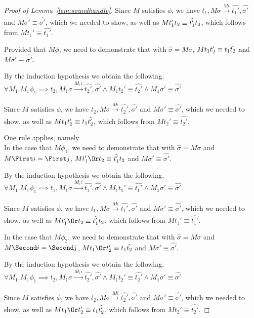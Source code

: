 \begin{proof}[Proof of Lemma~\ref{lem:soundhandle}]
{{    Since $M$ satisfies $\phi$, we have $t_1,M\sigma\xrightarrow[]{M i} \hat{t_1'},\hat{\sigma'}$ and $M\sigma'\equiv\hat{\sigma'}$,
    which we needed to show, as well as $M t_1'\relax t_2\equiv \hat{t_1'}\relax t_2$, which follows from $M t_1' \equiv \hat{t_1'}$.

    }
    {Provided that $M\phi$, we need to demonstrate that  with $\hat{\sigma}=M\sigma$,
    $M t_1\relax t_2'\equiv t_1\relax \hat{t_2}$ and $M\sigma'\equiv \hat{\sigma'}$.

    By the induction hypothesis we obtain the following.\\
    $\forall M_1 . M_1 \phi_1 \implies t_2,M_1\sigma \xrightarrow[]{M_1 i} \hat{t_2'},\hat{\sigma'}\land M_1 t_2'\equiv\hat{t_2'}\land M_1\sigma' \equiv \hat{\sigma'}$

    Since $M$ satisfies $\phi$, we have $t_2,M\sigma\xrightarrow[]{M i} \hat{t_2'},\hat{\sigma'}$ and $M\sigma'\equiv\hat{\sigma'}$,
    which we needed to show, as well as $M t_1\relax t_2'\equiv t_1\relax \hat{t_2'}$, which follows from $M t_2' \equiv \hat{t_2'}$.}
  }

  {One rule applies, namely \\

  In the case that $M\phi_1$, we need to demonstrate that  with $\hat{\sigma}=M\sigma$ and $M\First i =\First j$,
  $M t_1'\Or t_2\equiv \hat{t_1'}\And t_2$ and $M\sigma'\equiv \hat{\sigma'}$.

  By the induction hypothesis we obtain the following.\\
  $\forall M_1 . M_1 \phi_1 \implies t_1,M_1\sigma \xrightarrow[]{M_1 i} \hat{t_1'},\hat{\sigma'}\land M_1 t_1'\equiv\hat{t_1'}\land M_1\sigma' \equiv \hat{\sigma'}$.

  Since $M$ satisfies $\phi$, we have $t_1,M\sigma\xrightarrow[]{M i} \hat{t_1'},\hat{\sigma'}$ and $M\sigma'\equiv\hat{\sigma'}$,
  which we needed to show, as well as $M t_1'\Or t_2\equiv \hat{t_1'}\And t_2$, which follows from $M t_1' \equiv \hat{t_1'}$.

  In the case that $M\phi_2$, we need to demonstrate that  with $\hat{\sigma}=M\sigma$ and $M\Second i = \Second j$,
  $M t_1\Or t_2'\equiv t_1\And \hat{t_2}$ and $M\sigma'\equiv \hat{\sigma'}$.

  By the induction hypothesis we obtain the following.\\
  $\forall M_1 . M_1 \phi_1 \implies t_2,M_1\sigma \xrightarrow[]{M_1 i} \hat{t_2'},\hat{\sigma'}\land M_1 t_2'\equiv\hat{t_2'}\land M_1\sigma' \equiv \hat{\sigma'}$

  Since $M$ satisfies $\phi$, we have $t_2,M\sigma\xrightarrow[]{M i} \hat{t_2'},\hat{\sigma'}$ and $M\sigma'\equiv\hat{\sigma'}$,
  which we needed to show, as well as $M t_1\Or t_2'\equiv t_1\And \hat{t_2'}$, which follows from $M t_2' \equiv \hat{t_2'}$.}


\end{proof}



